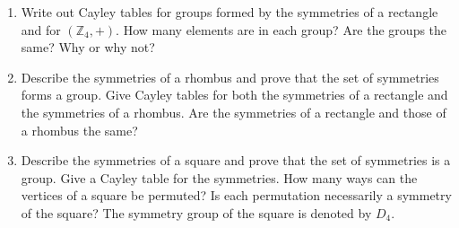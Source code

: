 \documentclass[12pt,reqno]{amsart}
\begin{document}
\begin{enumerate}[{\bf 1.}]
\begin{multicols}{2}
\begin{enumerate}
\item
\[
\begin{array}{c|cccc}
\circ & a & b & c & d \\
\hline
a & a & b & c & d \\
b & b & a & d & c \\
c & c & d & a & b \\
d & d & c & b & a
\end{array}
\]

 
 
\item
\[
\begin{array}{c|cccc}
\circ & a & b & c & d \\
\hline
a & a & b & c & d \\
b & b & c & d & a \\
c & c & d & a & b \\
d & d & a & b & c
\end{array}
\]

\item
\[
\begin{array}{c|cccc}
\circ & a & b & c & d \\
\hline
a & a & b & c & d \\
b & b & a & c & d \\
c & c & b & a & d \\
d & d & d & b & c
\end{array}
\]

\end{enumerate}
\end{multicols}

 
\item   %
Write out Cayley tables for groups formed by the symmetries of a
rectangle and for $({\mathbb Z}_4, +)$. How many elements are in each
group? Are the groups the same? Why or why not? 
 
 
\item %
Describe the symmetries of a rhombus and prove that the set of
symmetries forms a group. Give Cayley tables for both the symmetries
of a rectangle and the symmetries of a rhombus. Are the symmetries of
a rectangle and those of a rhombus the same?
 
 
\item %
Describe the symmetries of a square and prove that the set of
symmetries is a group. Give a Cayley table for the symmetries. How
many ways can the vertices of a square be permuted?  Is each
permutation necessarily a symmetry of the square?  The symmetry group
of the square is denoted by $D_4$.
 

\end{enumerate}
\end{document}
